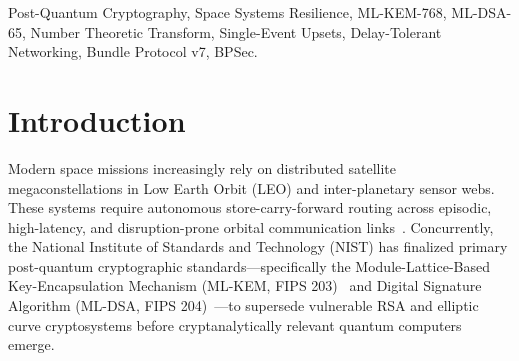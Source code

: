 \documentclass[conference,10pt]{IEEEtran}
\begin{document}
\begin{IEEEkeywords}
Post-Quantum Cryptography, Space Systems Resilience, ML-KEM-768, ML-DSA-65, Number Theoretic Transform, Single-Event Upsets, Delay-Tolerant Networking, Bundle Protocol v7, BPSec.
\end{IEEEkeywords}

\section{Introduction}
\label{sec:intro}

Modern space missions increasingly rely on distributed satellite megaconstellations in Low Earth Orbit (LEO) and inter-planetary sensor webs. These systems require autonomous store-carry-forward routing across episodic, high-latency, and disruption-prone orbital communication links~\cite{RFC9171_BPv7}. Concurrently, the National Institute of Standards and Technology (NIST) has finalized primary post-quantum cryptographic standards—specifically the Module-Lattice-Based Key-Encapsulation Mechanism (ML-KEM, FIPS 203)~\cite{NIST_FIPS_203} and Digital Signature Algorithm (ML-DSA, FIPS 204)~\cite{NIST_FIPS_204}—to supersede vulnerable RSA and elliptic curve cryptosystems before cryptanalytically relevant quantum computers emerge.
\end{document}
